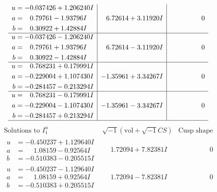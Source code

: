 \documentclass[1p]{elsarticle_modified}
\theoremstyle{definition}
\newcommand{\I}{\sqrt{-1}}
\begin{document}
$$\begin{array}{c|c|c}
\begin{aligned}
u &= -0.037426 + 1.206240 I \\
a &= \phantom{-}0.79761 - 1.93796 I \\
b &= \phantom{-}0.30922 + 1.42884 I\end{aligned}
 & \phantom{-}6.72614 + 3.11920 I & \phantom{-0.000000 } 0 \\ \hline\begin{aligned}
u &= -0.037426 - 1.206240 I \\
a &= \phantom{-}0.79761 + 1.93796 I \\
b &= \phantom{-}0.30922 - 1.42884 I\end{aligned}
 & \phantom{-}6.72614 - 3.11920 I & \phantom{-0.000000 } 0 \\ \hline\begin{aligned}
u &= \phantom{-}0.768231 + 0.179991 I \\
a &= -0.229004 + 1.107430 I \\
b &= -0.284457 - 0.213294 I\end{aligned}
 & -1.35961 + 3.34267 I & \phantom{-0.000000 } 0 \\ \hline\begin{aligned}
u &= \phantom{-}0.768231 - 0.179991 I \\
a &= -0.229004 - 1.107430 I \\
b &= -0.284457 + 0.213294 I\end{aligned}
 & -1.35961 - 3.34267 I & \phantom{-0.000000 } 0\\
 \hline 
 \end{array}$$\newpage$$\begin{array}{c|c|c}  
\text{Solutions to }I^u_{1}& \I (\text{vol} + \sqrt{-1}CS) & \text{Cusp shape}\\
 \hline 
\begin{aligned}
u &= -0.450237 + 1.129640 I \\
a &= \phantom{-}1.08159 - 0.92564 I \\
b &= -0.510383 - 0.205515 I\end{aligned}
 & \phantom{-}1.72094 + 7.82381 I & \phantom{-0.000000 } 0 \\ \hline\begin{aligned}
u &= -0.450237 - 1.129640 I \\
a &= \phantom{-}1.08159 + 0.92564 I \\
b &= -0.510383 + 0.205515 I\end{aligned}
 & \phantom{-}1.72094 - 7.82381 I & \phantom{-0.000000 } 0 \\ \hline\begin{aligned}

\end{aligned}
\end{array}$$
\end{document}
